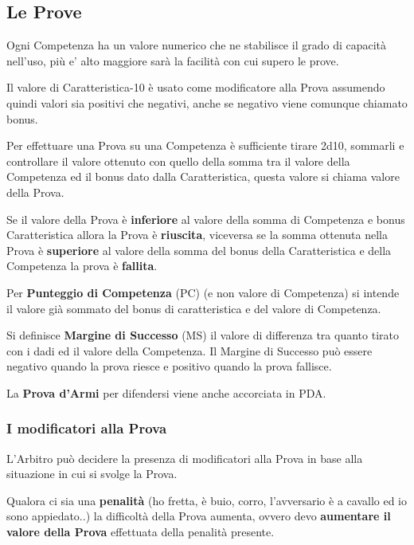 \documentclass[12pt,a4paper,twoside,openany]{book}
\begin{document}
\begin{multicols}{2}
	
\subsection{Le Prove}

Ogni Competenza ha un valore numerico che ne stabilisce il grado di capacità nell'uso, più e' alto maggiore sarà la facilità con cui supero le prove.

Il valore di Caratteristica-10 è usato come modificatore alla Prova assumendo quindi valori sia positivi che negativi, anche se negativo viene comunque chiamato bonus.

Per effettuare una Prova su una Competenza è sufficiente tirare 2d10, sommarli e controllare il valore ottenuto con quello della somma tra il valore della Competenza ed il bonus dato dalla Caratteristica, questa valore si chiama valore della Prova.

Se il valore della Prova è \textbf{inferiore} al valore della somma di Competenza e bonus Caratteristica allora la Prova è \textbf{riuscita}, viceversa se la somma ottenuta nella Prova è \textbf{superiore} al valore della somma del bonus della Caratteristica e della Competenza la prova è \textbf{fallita}.

Per \textbf{Punteggio di Competenza} (PC) (e non valore di Competenza) si intende il valore già sommato del bonus di caratteristica e del valore di Competenza.

Si definisce \textbf{Margine di Successo} (MS) il valore di differenza tra quanto tirato con i dadi ed il valore della Competenza. Il Margine di Successo può essere negativo quando la prova riesce e positivo quando la prova fallisce.

La \textbf{Prova d'Armi} per difendersi viene anche accorciata in PDA.

\subsubsection{I modificatori alla Prova}

L'Arbitro può decidere la presenza di modificatori alla Prova in base alla situazione in cui si svolge la Prova.

Qualora ci sia una \textbf{penalità} (ho fretta, è buio, corro, l'avversario è a cavallo ed io sono appiedato..) la difficoltà della Prova aumenta, ovvero devo \textbf{aumentare il valore della Prova} effettuata della penalità presente.


\end{multicols}
\end{document}

